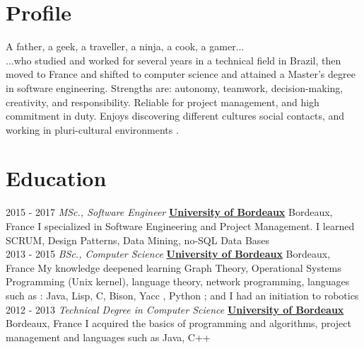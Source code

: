 \documentclass[letterpaper]{twentysecondcv} %
\begin{document}
\makeprofile %


\section{Profile}

A father, a geek, a traveller, a ninja, a cook, a gamer... \\ ...who studied and worked for several years in a technical field in Brazil, then moved to France and shifted to computer science and attained a Master’s degree in software engineering. Strengths are: autonomy, teamwork, decision-making, creativity, and responsibility. Reliable for project management, and high commitment in duty.
Enjoys discovering different cultures social contacts, and working in
pluri-cultural environments .





\section{Education}

\begin{twenty} %
  \twentyitem
      {2015 - 2017}
        {}
        { \textit{MSc., Software Engineer}}
        {\href{http://www.u-bordeaux.com/}{\textbf{University of Bordeaux}}}
        {Bordeaux, France}
        {I specialized in Software Engineering and Project Management. I learned SCRUM, Design Patterns, Data Mining, no-SQL
Data Bases}
    \\
  \twentyitem
      {2013 - 2015}
    {}
        { \textit{BSc., Computer Science}}
        {\href{http://www.u-bordeaux.com/}{\textbf{University of Bordeaux}}}
        {Bordeaux, France}
        {My knowledge deepened learning Graph Theory, Operational Systems Programming (Unix kernel), language theory, network programming, languages such as : Java, Lisp, C, Bison, Yacc , Python ; and I had an initiation to robotics}
    \\
  \twentyitem
      {2012 - 2013}
    {}
        {\textit{Technical Degree in Computer Science}}
        {\href{http://www.u-bordeaux.com/}{\textbf{University of Bordeaux}}}
        {Bordeaux, France}
        {I acquired the basics of programming and algorithms, project management and languages such as Java, C++}

\end{twenty}
\end{document}
